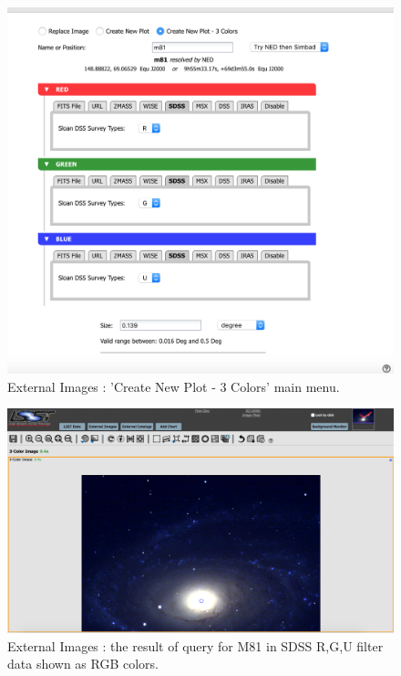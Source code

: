 \documentclass[DM,lsstdraft,toc]{lsstdoc}
\begin{document}
\begin{figure}
\includegraphics[width=\textwidth]{figs/external_images_rgb.png}
\caption{External Images : 'Create New Plot - 3 Colors' main menu.  }
\label{fig:ext_images_rgb}
\end{figure}

\begin{figure}
\includegraphics[width=\textwidth]{figs/external_images_rgb_query.png}
\caption{External Images :  the result of query for M81 in SDSS R,G,U filter data shown as RGB colors.}
\label{fig:ext_images_rgb_query}
\end{figure}
\end{document}
